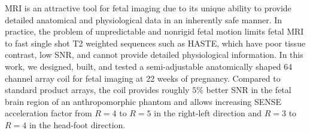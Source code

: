 MRI is an attractive tool for fetal imaging due to its unique ability to provide detailed anatomical and physiological
data in an inherently safe manner. In practice, the problem of unpredictable and nonrigid fetal motion limits fetal MRI
to fast single shot T2 weighted sequences such as HASTE, which have poor tissue contrast, low SNR, and cannot provide
detailed physiological information. In this work, we designed, built, and tested a semi-adjustable anatomically shaped
64 channel array coil for fetal imaging at 22 weeks of pregnancy. Compared to standard product arrays, the coil provides
roughly $5\%$ better SNR in the fetal brain region of an anthropomorphic phantom and allows increasing SENSE
acceleration factor from $R=4$ to $R=5$ in the right-left direction and $R=3$ to $R=4$ in the head-foot direction.

